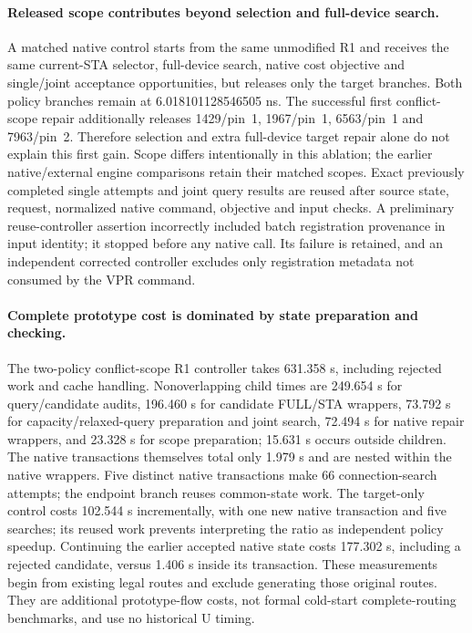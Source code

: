 \paragraph{Released scope contributes beyond selection and full-device search.}
A matched native control starts from the same unmodified R1 and receives the same current-STA selector, full-device search, native cost objective and single/joint acceptance opportunities, but releases only the target branches. Both policy branches remain at 6.018101128546505 ns. The successful first conflict-scope repair additionally releases 1429/pin~1, 1967/pin~1, 6563/pin~1 and 7963/pin~2. Therefore selection and extra full-device target repair alone do not explain this first gain. Scope differs intentionally in this ablation; the earlier native/external engine comparisons retain their matched scopes. Exact previously completed single attempts and joint query results are reused after source state, request, normalized native command, objective and input checks. A preliminary reuse-controller assertion incorrectly included batch registration provenance in input identity; it stopped before any native call. Its failure is retained, and an independent corrected controller excludes only registration metadata not consumed by the VPR command.

\paragraph{Complete prototype cost is dominated by state preparation and checking.}
The two-policy conflict-scope R1 controller takes 631.358 s, including rejected work and cache handling. Nonoverlapping child times are 249.654 s for query/candidate audits, 196.460 s for candidate FULL/STA wrappers, 73.792 s for capacity/relaxed-query preparation and joint search, 72.494 s for native repair wrappers, and 23.328 s for scope preparation; 15.631 s occurs outside children. The native transactions themselves total only 1.979 s and are nested within the native wrappers. Five distinct native transactions make 66 connection-search attempts; the endpoint branch reuses common-state work. The target-only control costs 102.544 s incrementally, with one new native transaction and five searches; its reused work prevents interpreting the ratio as independent policy speedup. Continuing the earlier accepted native state costs 177.302 s, including a rejected candidate, versus 1.406 s inside its transaction. These measurements begin from existing legal routes and exclude generating those original routes. They are additional prototype-flow costs, not formal cold-start complete-routing benchmarks, and use no historical U timing.


